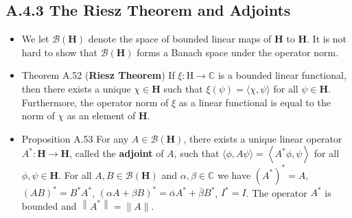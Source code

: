 \subsection{A.4.3 The Riesz Theorem and Adjoints}

\begin{itemize}
\item We let $\mathcal{B}(\mathbf{H})$ denote the space of bounded linear maps of $\mathbf{H}$ to $\mathbf{H}$. It is not hard to show that $\mathcal{B}(\mathbf{H})$ forms a Banach space under the operator norm.

\item Theorem A.52 (\textbf{Riesz Theorem}) If $\xi: \mathrm{H} \rightarrow \mathbb{C}$ is a bounded linear functional, then there exists a unique $\chi \in \mathbf{H}$ such that $\xi(\psi)=\langle\chi, \psi\rangle$ for all $\psi \in \mathbf{H}$. Furthermore, the operator norm of $\xi$ as a linear functional is equal to the norm of $\chi$ as an element of $\mathbf{H}$.

\item Proposition A.53 For any $A \in \mathcal{B}(\mathbf{H})$, there exists a unique linear operator $A^{*}: \mathbf{H} \rightarrow \mathbf{H}$, called the \textbf{adjoint} of $A$, such that $\langle\phi, A \psi\rangle=\left\langle A^{*} \phi, \psi\right\rangle$ for all $\phi, \psi \in \mathbf{H}$. For all $A, B \in \mathcal{B}(\mathbf{H})$ and $\alpha, \beta \in \mathbb{C}$ we have $\left(A^{*}\right)^{*} =A$, $(A B)^{*} =B^{*} A^{*}$, $(\alpha A+\beta B)^{*} =\bar{\alpha} A^{*}+\bar{\beta} B^{*}$, $I^{*} =I$. The operator $A^{*}$ is bounded and $\left\|A^{*}\right\|=\|A\|$.

\end{itemize}

